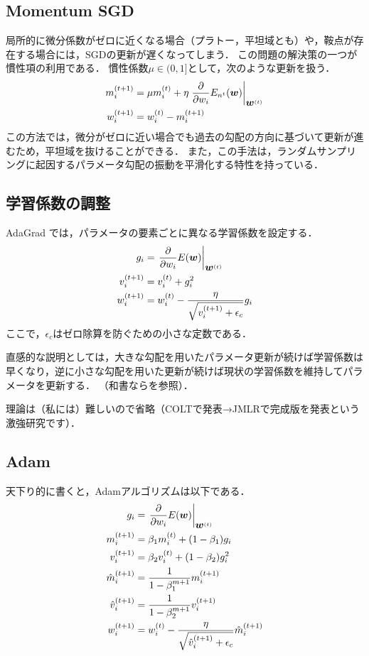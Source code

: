 \subsection{Momentum SGD}
局所的に微分係数がゼロに近くなる場合（プラトー，平坦域とも）や，鞍点が存在する場合には，SGDの更新が遅くなってしまう．
この問題の解決策の一つが慣性項の利用である．
慣性係数$\mu\in(0,1]$として，次のような更新を扱う．
\begin{align*}
 m_i^{(t+1)} &= \mu m_i^{(t)} + \eta \left.\frac{\partial}{\partial w_i}E_{n^t}(\mbox{\boldmath $w$})\right|_{\mbox{\boldmath $w$}^{(t)}}
 \\
 w_i^{(t+1)} &= w_i^{(t)} - m_i^{(t+1)}
\end{align*}
この方法では，微分がゼロに近い場合でも過去の勾配の方向に基づいて更新が進むため，平坦域を抜けることができる．
また，この手法は，ランダムサンプリングに起因するパラメータ勾配の振動を平滑化する特性を持っている．


\subsection{学習係数の調整}
AdaGrad \cite{duchi2011adaptive}では，パラメータの要素ごとに異なる学習係数を設定する．
\begin{align*}
 g_i &= \left.\frac{\partial}{\partial w_i}E(\mbox{\boldmath $w$})\right|_{\mbox{\boldmath $w$}^{(t)}}
 \\
 v_i^{(t+1)} &= v_i^{(t)} + g_i^2
 \\
 w_i^{(t+1)} &= w_i^{(t)}-\frac{\eta}{\sqrt{v_i^{(t+1)}+\epsilon_c}} g_i
\end{align*}
ここで，$\epsilon_c$はゼロ除算を防ぐための小さな定数である．

直感的な説明としては，大きな勾配を用いたパラメータ更新が続けば学習係数は早くなり，逆に小さな勾配を用いた更新が続けば現状の学習係数を維持してパラメータを更新する．
（和書なら\cite{harada2017image,suzuki2015stochastic}を参照）．

理論は（私には）難しいので省略（COLTで発表→JMLRで完成版を発表という激強研究です）．


\subsection{Adam}
天下り的に書くと，Adamアルゴリズムは以下である．
\begin{align*}
 g_i &= \left.\frac{\partial}{\partial w_i}E(\mbox{\boldmath $w$})\right|_{\mbox{\boldmath $w$}^{(t)}}
 \\
 m_i^{(t+1)} &= \beta_1m_i^{(t)} + (1-\beta_1)g_i
 \\
 v_i^{(t+1)} &= \beta_2v_i^{(t)} + (1-\beta_2)g_i^2
 \\
 \hat{m}_i^{(t+1)} &= \frac{1}{1-\beta_1^{m+1}}m_i^{(t+1)}
 \\
 \hat{v}_i^{(t+1)} &= \frac{1}{1-\beta_2^{m+1}}v_i^{(t+1)}
 \\
 w_i^{(t+1)} &= w_i^{(t)}-\frac{\eta}{\sqrt{\hat{v}_i^{(t+1)}+\epsilon_c}}\hat{m}_i^{(t+1)}
\end{align*}

